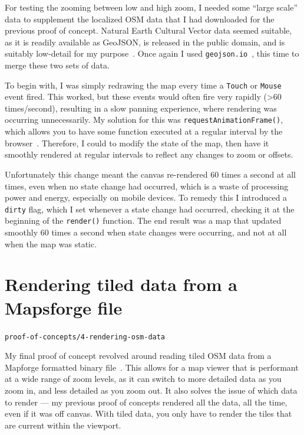 \documentclass[]{final_report}
\begin{document}
For testing the zooming between low and high zoom, I needed some ``large scale'' data to supplement the localized OSM data that I had downloaded for the previous proof of concept. Natural Earth Cultural Vector data seemed suitable, as it is readily available as GeoJSON, is released in the public domain, and is suitably low-detail for my purpose~\cite{natural-earth}. Once again I used \texttt{geojson.io}~\cite{geojson.io}, this time to merge these two sets of data.

To begin with, I was simply redrawing the map every time a \texttt{Touch} or \texttt{Mouse} event fired. This worked, but these events would often fire very rapidly (>60 times/second), resulting in a slow panning experience, where rendering was occurring unnecessarily. My solution for this was \texttt{requestAnimationFrame()}, which allows you to have some function executed at a regular interval by the browser~\cite{mdn-request-animation-frame}. Therefore, I could to modify the state of the map, then have it smoothly rendered at regular intervals to reflect any changes to zoom or offsets. 

Unfortunately this change meant the canvas re-rendered 60 times a second at all times, even when no state change had occurred, which is a waste of processing power and energy, especially on mobile devices. To remedy this I introduced a \texttt{dirty} flag, which I set whenever a state change had occurred, checking it at the beginning of the \texttt{render()} function. The end result was a map that updated smoothly 60 times a second when state changes were occurring, and not at all when the map was static.

\section{Rendering tiled data from a Mapsforge file}

\hfill \texttt{proof-of-concepts/4-rendering-osm-data}

My final proof of concept revolved around reading tiled OSM data from a Mapforge formatted binary file~\cite{mapsforge-format}. This allows for a map viewer that is performant at a wide range of zoom levels, as it can switch to more detailed data as you zoom in, and less detailed as you zoom out. It also solves the issue of which data to render --- my previous proof of concepts rendered all the data, all the time, even if it was off canvas. With tiled data, you only have to render the tiles that are current within the viewport.
\end{document}
